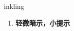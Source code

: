 
\begin{frame}
{\huge inkling}
\begin{center}
\begin{enumerate}\Large
  \item \textbf{轻微暗示，小提示}
\end{enumerate}
\end{center}
\end{frame}
